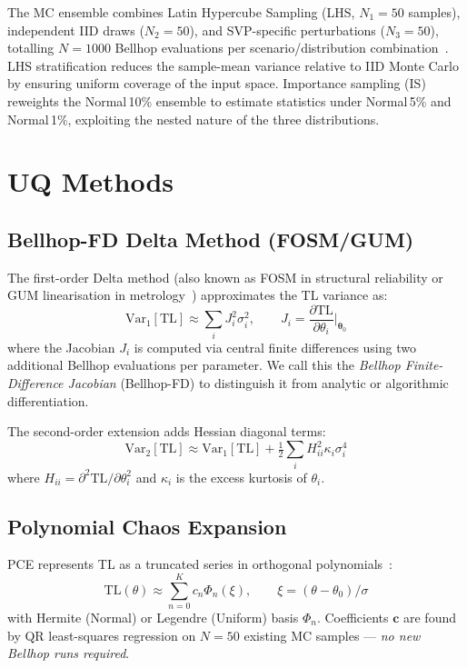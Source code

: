 \documentclass[journal,10pt,twoside]{IEEEtran}
\newcommand{\Var}{\mathrm{Var}}
\newcommand{\TL}{\mathrm{TL}}
\begin{document}
The MC ensemble combines Latin Hypercube Sampling (LHS, $N_1 = 50$ samples),
independent IID draws ($N_2 = 50$), and SVP-specific perturbations ($N_3 = 50$),
totalling $N = 1000$ Bellhop evaluations per scenario/distribution
combination~\cite{iman2008}.
LHS stratification reduces the sample-mean variance relative to IID Monte Carlo
by ensuring uniform coverage of the input space.
Importance sampling (IS) reweights the Normal\,10\% ensemble to estimate
statistics under Normal\,5\% and Normal\,1\%, exploiting the nested nature of
the three distributions.

\section{UQ Methods}
\label{sec:methods}

\subsection{Bellhop-FD Delta Method (FOSM/GUM)}
\label{sec:delta}

The first-order Delta method (also known as FOSM in structural reliability or
GUM linearisation in metrology~\cite{bipm2008gum}) approximates the TL variance as:
\begin{equation}
  \Var_1[\TL] \approx \sum_{i} J_i^2 \sigma_i^2, \qquad
  J_i = \frac{\partial \TL}{\partial \theta_i}\bigg|_{\boldsymbol{\theta}_0}
  \label{eq:delta1}
\end{equation}
where the Jacobian $J_i$ is computed via central finite differences using two
additional Bellhop evaluations per parameter.
We call this the \emph{Bellhop Finite-Difference Jacobian} (Bellhop-FD) to
distinguish it from analytic or algorithmic differentiation.

The second-order extension adds Hessian diagonal terms:
\begin{equation}
  \Var_2[\TL] \approx \Var_1[\TL]
    + \tfrac{1}{2}\sum_i H_{ii}^2 \kappa_i \sigma_i^4
  \label{eq:delta2}
\end{equation}
where $H_{ii} = \partial^2\TL/\partial\theta_i^2$ and $\kappa_i$ is the excess
kurtosis of $\theta_i$.

\subsection{Polynomial Chaos Expansion}
\label{sec:pce}

PCE represents TL as a truncated series in orthogonal polynomials~\cite{finette2009}:
\begin{equation}
  \TL(\theta) \approx \sum_{n=0}^{K} c_n \Phi_n(\xi), \qquad
  \xi = (\theta - \theta_0)/\sigma
  \label{eq:pce}
\end{equation}
with Hermite (Normal) or Legendre (Uniform) basis $\Phi_n$.
Coefficients $\mathbf{c}$ are found by QR least-squares regression on $N{=}50$
existing MC samples --- \emph{no new Bellhop runs required}.
\end{document}
